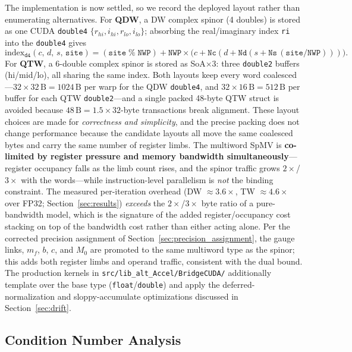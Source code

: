 \documentclass[12pt,a4paper]{article}
\newcommand{\NWP}{\mathtt{NWP}}
\newcommand{\Nc}{\mathtt{Nc}}
\newcommand{\Nd}{\mathtt{Nd}}
\newcommand{\Ns}{\mathtt{Ns}}
\begin{document}
The implementation is now settled, so we record the deployed layout rather than
enumerating alternatives. For \textbf{QDW}, a DW complex spinor (4 doubles) is
stored as one CUDA \texttt{double4} $\{r_{hi}, i_{hi}, r_{lo}, i_{lo}\}$;
absorbing the real/imaginary index \texttt{ri} into the \texttt{double4} gives
\begin{equation}
  \mathrm{index}_{\texttt{d4}}(c,\, d,\, s,\, \mathtt{site})
  = (\mathtt{site}\;\%\;\NWP)
  + \NWP \times
  \bigl(c + \Nc(d + \Nd(s + \Ns\,(\mathtt{site}/\NWP)))\bigr).
  \label{eq:d4_index}
\end{equation}
For \textbf{QTW}, a 6-double complex spinor is stored as SoA$\times3$: three
\texttt{double2} buffers (hi/mid/lo), all sharing the same index. Both layouts
keep every word coalesced---$32 \times 32\,\text{B} = 1024\,\text{B}$ per warp
for the QDW \texttt{double4}, and $32 \times 16\,\text{B} = 512\,\text{B}$ per
buffer for each QTW \texttt{double2}---and a single packed 48-byte QTW struct is
avoided because $48\,\text{B} = 1.5 \times 32$-byte transactions break
alignment. These layout choices are made for \emph{correctness and simplicity},
and the precise packing does not change performance because the candidate
layouts all move the same coalesced bytes and carry the same number of register
limbs. The multiword SpMV is \textbf{co-limited by register pressure and memory
bandwidth simultaneously}---register occupancy falls as the limb count rises,
and the spinor traffic grows $2\times$/$3\times$ with the words---while
instruction-level parallelism is \emph{not} the binding constraint. The measured
per-iteration overhead (DW $\approx 3.6\times$, TW $\approx 4.6\times$ over FP32;
Section~\ref{sec:results}) \emph{exceeds} the $2\times$/$3\times$ byte ratio of a
pure-bandwidth model, which is the signature of the added register/occupancy
cost stacking on top of the bandwidth cost rather than either acting alone. Per
the corrected precision assignment of Section~\ref{sec:precision_assignment}, the
gauge links, $m_f$, $b$, $c$, and $M_0$ are promoted to the same multiword type
as the spinor; this adds both register limbs and operand traffic, consistent
with the dual bound. The production kernels in
\texttt{src/lib\_alt\_Accel/BridgeCUDA/} additionally template over the base
type (\texttt{float}/\texttt{double}) and apply the deferred-normalization and
sloppy-accumulate optimizations discussed in Section~\ref{sec:drift}.

\subsection{Condition Number Analysis}
\label{sec:lqcd_comparison}
\end{document}
